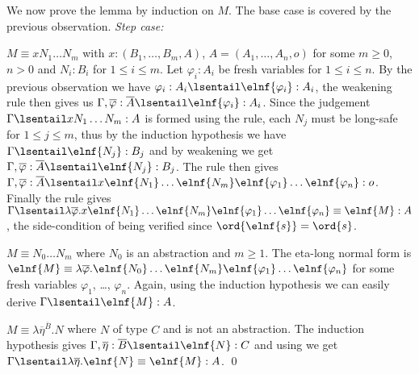 We now prove the lemma by induction on $M$.
The base case is covered by the previous observation.
\emph{Step case:}
\begin{compactitem}
\item $M \equiv x N_1 \ldots N_m$ with $x: (B_1, \ldots, B_m, A)$, $A = (A_1, \ldots, A_n, o)$ for some $m\geq 0$, $n>0$ and $N_i : B_i$ for $1 \leq i \leq
  m$.  Let $\varphi_i: A_i$ be fresh variables for $1\leq i \leq
  n$. By the previous observation we have $\varphi_i :A_i \lsentail \elnf{\varphi_i} :A_i$, the weakening rule then gives us $\Gamma , \overline{\varphi} : \overline{A}
  \lsentail \elnf{\varphi_i} : A_i$.  Since the judgement
  $\Gamma \lsentail x N_1 \ldots N_m : A$ is formed using the  rule, each $N_j$ must be long-safe for $1\leq j \leq m$, thus by the induction hypothesis we have $\Gamma \lsentail \elnf{N_j} : B_j$ and by weakening we get $\Gamma, \overline{\varphi} :\overline{A} \lsentail \elnf{N_j} : B_j$.  The 
  rule then gives $\Gamma, \overline{\varphi} :\overline{A} \lsentail x \elnf{N_1} \ldots \elnf{N_m} \elnf{\varphi_1} \ldots \elnf{\varphi_n} : o$. Finally
  the  rule gives $\Gamma \lsentail \lambda \overline{\varphi} . x
  \elnf{N_1} \ldots \elnf{N_m} \elnf{\varphi_1} \ldots
  \elnf{\varphi_n} \equiv \elnf{M} : A$, the side-condition of  being verified since $\ord{\elnf{s}} = \ord{s}$.


\item $M \equiv N_0 \ldots N_m$ where $N_0$ is an abstraction and $m\geq 1$.
The eta-long normal form is $\elnf{M} \equiv \lambda \overline{\varphi}. \elnf{N_0} \ldots \elnf{N_m} \elnf{\varphi_1}  \ldots \elnf{\varphi_n}$ for some fresh variables $\varphi_1$, \ldots, $\varphi_n$. Again, using the induction hypothesis we can easily derive $\Gamma \lsentail
 \elnf{M} : A$.

\item $M \equiv \lambda \overline{\eta}^{\overline{B}} . N $ where
$N$ of type $C$ and is not an abstraction. The induction hypothesis gives $\Gamma,
  \overline{\eta} : \overline{B} \lsentail \elnf{N} : C$ and using
 we get $\Gamma \lsentail \lambda \overline{\eta} . \elnf{N} \equiv \elnf{M} : A$.  \qed
\end{compactitem}

